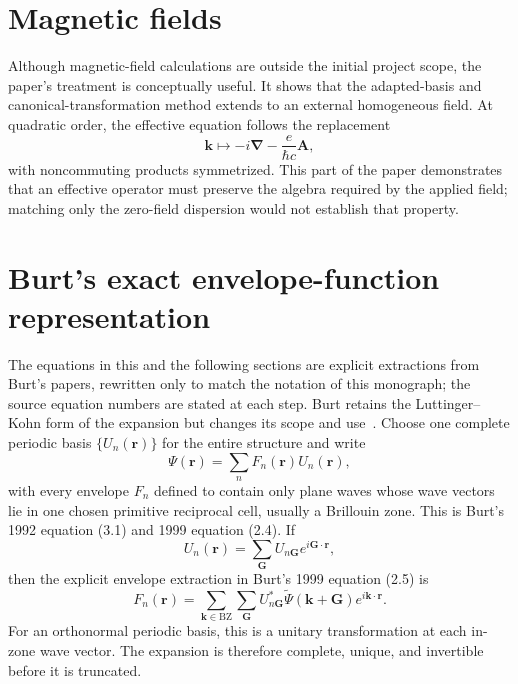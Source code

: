 \section{Magnetic fields}

Although magnetic-field calculations are outside the initial project scope,
the paper's treatment is conceptually useful. It shows that the adapted-basis
and canonical-transformation method extends to an external homogeneous field.
At quadratic order, the effective equation follows the replacement
\begin{equation}
  \mathbf k
  \longmapsto
  -i\boldsymbol\nabla-\frac{e}{\hbar c}\mathbf A,
\end{equation}
with noncommuting products symmetrized. This part of the paper demonstrates
that an effective operator must preserve the algebra required by the applied
field; matching only the zero-field dispersion would not establish that
property.

\section{Burt's exact envelope-function representation}

The equations in this and the following sections are explicit extractions from
Burt's papers, rewritten only to match the notation of this monograph; the
source equation numbers are stated at each step. Burt retains the
Luttinger--Kohn form of the expansion but changes its scope and
use~\cite{burt1992,burt1999}. Choose one complete periodic basis
$\{U_n(\mathbf r)\}$ for the entire structure and write
\begin{equation}
  \Psi(\mathbf r)
  =
  \sum_n F_n(\mathbf r)U_n(\mathbf r),
  \label{eq:burt-envelope-expansion}
\end{equation}
with every envelope $F_n$ defined to contain only plane waves whose wave vectors
lie in one chosen primitive reciprocal cell, usually a Brillouin zone. This is
Burt's 1992 equation (3.1) and 1999 equation (2.4). If
\begin{equation}
  U_n(\mathbf r)
  =
  \sum_{\mathbf G}U_{n\mathbf G}e^{i\mathbf G\cdot\mathbf r},
\end{equation}
then the explicit envelope extraction in Burt's 1999 equation (2.5) is
\begin{equation}
  F_n(\mathbf r)
  =
  \sum_{\mathbf k\in\mathrm{BZ}}
  \sum_{\mathbf G}
  U_{n\mathbf G}^{*}
  \widetilde\Psi(\mathbf k+\mathbf G)
  e^{i\mathbf k\cdot\mathbf r}.
  \label{eq:burt-explicit-envelope-coefficient}
\end{equation}
For an orthonormal periodic basis, this is a unitary transformation at each
in-zone wave vector. The expansion is therefore complete, unique, and
invertible before it is truncated.

